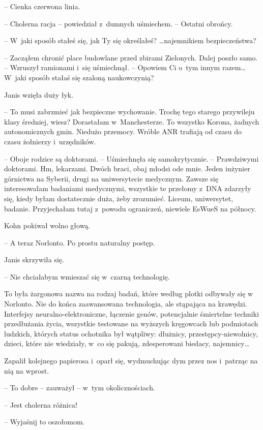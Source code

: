 \documentclass[oneside,polish,11pt,sfheadings]{mwbk}
\begin{document}
-- Cienka czerwona linia.

-- Cholerna racja -- powiedział z~dumnych uśmiechem. -- Ostatni obrońcy.

-- W~jaki sposób stałeś się, jak Ty się określałeś? \ldots najemnikiem
bezpieczeństwa?

-- Zacząłem chronić place budowlane przed zbirami Zielonych. Dalej poszło
samo. -- Wzruszył ramionami i~się uśmiechnął. -- Opowiem Ci o~tym innym
razem\ldots W~jaki sposób stałaś się szaloną naukowczynią?

Janis wzięła duży łyk. 

-- To musi zabrzmieć jak bezpieczne wychowanie.
Trochę tego starego przywileju klasy średniej, wiesz? Dorastałam w~Manchesterze. To wszystko Korona, żadnych autonomicznych gmin. Niedużo
przemocy. Wróble ANR trafiają od czasu do czasu żołnierzy i~urzędników.

-- Oboje rodzice są doktorami. -- Uśmiechnęła się samokrytycznie. -- Prawdziwymi doktorami. Hm, lekarzami. Dwóch braci, obaj młodsi ode mnie.
Jeden inżynier górnictwa na Syberii, drugi na uniwersytecie medycznym.
Zawsze się interesowałam badaniami medycznymi, wszystkie te przełomy z~DNA zdarzyły się, kiedy byłam dostatecznie duża, żeby zrozumieć. Liceum,
uniwersytet, badanie. Przyjechałam tutaj z~powodu ograniczeń, niewiele
EsWueS na północy.

Kohn pokiwał wolno głową. 

-- A teraz Norlonto. Po prostu naturalny
postęp.

Janis skrzywiła się. 

-- Nie chciałabym wmieszać się w~czarną technologię.

To była żargonowa nazwa na rodzaj badań, które według plotki odbywały
się w Norlonto. Nie do końca zaawansowana technologia, ale stąpająca na
krawędzi. Interfejsy neuralno-elektroniczne, łączenie genów,
potencjalnie śmiertelne techniki przedłużania życia, wszystkie testowane
na wyższych kręgowcach lub podmiotach ludzkich, których status ochotnika
był wątpliwy: dłużnicy, przestępcy-niewolnicy, dzieci, które nie
wiedziały, w~co się pakują, zdesperowani biedacy, najemnicy\ldots

Zapalił kolejnego papierosa i~oparł się, wydmuchując dym przez nos i~patrząc na nią na wprost. 

-- To dobre -- zauważył -- w~tym okolicznościach.

-- Jest cholerna różnica!

-- Wyjaśnij to oszołomom.
\end{document}
